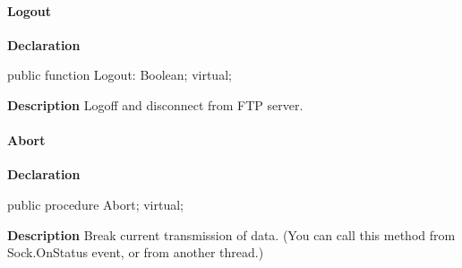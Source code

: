 \documentclass{report}
\newif\ifpdf
\begin{document}
\paragraph*{Logout}\hspace*{\fill}

\label{ftpsend.TFTPSend-Logout}
\begin{list}{}{
\setlength{\itemindent}{0cm}
\setlength{\listparindent}{0cm}
\setlength{\leftmargin}{\evensidemargin}
\addtolength{\leftmargin}{\tmplength}
\settowidth{\labelsep}{X}
\addtolength{\leftmargin}{\labelsep}
\setlength{\labelwidth}{\tmplength}
}
\item[\textbf{Declaration}\hfill]
\ifpdf
\begin{flushleft}
\fi
\begin{ttfamily}
public function Logout: Boolean; virtual;\end{ttfamily}

\ifpdf
\end{flushleft}
\fi

\par
\item[\textbf{Description}]
Logoff and disconnect from FTP server.

\end{list}
\paragraph*{Abort}\hspace*{\fill}

\label{ftpsend.TFTPSend-Abort}
\begin{list}{}{
\setlength{\itemindent}{0cm}
\setlength{\listparindent}{0cm}
\setlength{\leftmargin}{\evensidemargin}
\addtolength{\leftmargin}{\tmplength}
\settowidth{\labelsep}{X}
\addtolength{\leftmargin}{\labelsep}
\setlength{\labelwidth}{\tmplength}
}
\item[\textbf{Declaration}\hfill]
\ifpdf
\begin{flushleft}
\fi
\begin{ttfamily}
public procedure Abort; virtual;\end{ttfamily}

\ifpdf
\end{flushleft}
\fi

\par
\item[\textbf{Description}]
Break current transmission of data. (You can call this method from Sock.OnStatus event, or from another thread.)

\end{list}
\end{document}
